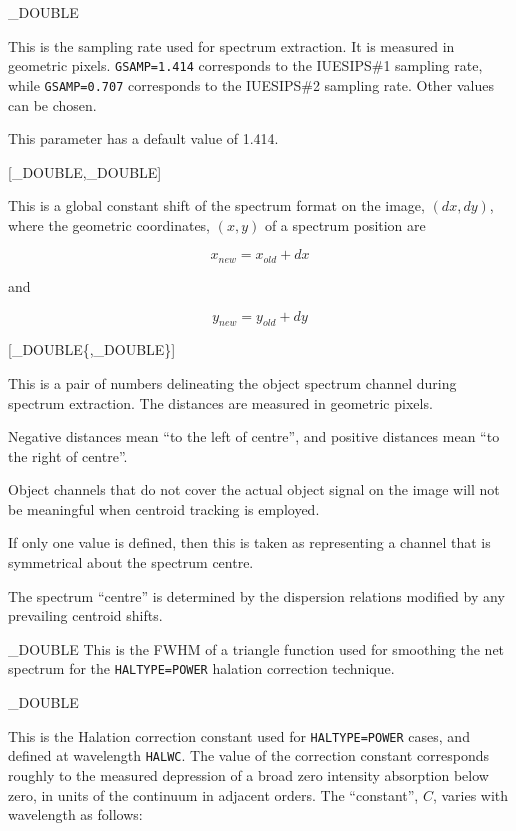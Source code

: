 {
{
   \_DOUBLE
}{
   This is the sampling rate used for spectrum extraction.
   It is measured in geometric pixels.
   \verb+GSAMP=1.414+ corresponds to the IUESIPS\#1 sampling
   rate, while \verb+GSAMP=0.707+ corresponds to the IUESIPS\#2 sampling
   rate.
   Other values can be chosen.

   This parameter has a default value of 1.414.
}

{
   [\_DOUBLE,\_DOUBLE]
}{
   This is a global constant shift of the spectrum format on the image,
   $(dx,dy)$, where the geometric coordinates, $(x,y)$ of a spectrum position
   are

   \begin {equation}
      x_{new} = x_{old} + dx
   \end {equation}

   and

   \begin {equation}
      y_{new} = y_{old} + dy
   \end {equation}
}

{
   [\_DOUBLE\{,\_DOUBLE\}]
}{
   This is a pair of numbers delineating the object spectrum channel
   during spectrum extraction.
   The distances are measured in geometric pixels.

   Negative distances mean ``to the left of centre'', and positive distances
   mean ``to the right of centre''.

   Object channels that do not cover the actual object signal on the
   image will not be meaningful when centroid tracking is employed.

   If only one value is defined, then this is taken as representing
   a channel that is symmetrical about the spectrum centre.

   The spectrum ``centre'' is determined by the dispersion relations
   modified by any prevailing centroid shifts.
}

{
   \_DOUBLE
}{
   This is the FWHM of a triangle function used for smoothing the
   net spectrum for the \verb+HALTYPE=POWER+ halation correction technique.
}

{
   \_DOUBLE
}{
   This is the Halation correction constant used for \verb+HALTYPE=POWER+
   cases, and defined at wavelength \verb+HALWC+\@.
   The value of the correction constant
   corresponds roughly to the measured depression of a broad
   zero intensity absorption below zero, in units
   of the continuum in adjacent orders.
   The ``constant'', $C$, varies with wavelength as follows:

}}
